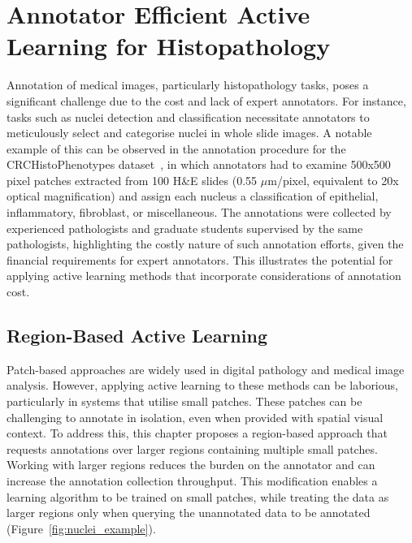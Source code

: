 \section{Annotator Efficient Active Learning for Histopathology}
\label{sec:active_annotator_efficient}
Annotation of medical images, particularly histopathology tasks, poses a significant challenge due to the cost and lack of expert annotators. For instance, tasks such as nuclei detection and classification necessitate annotators to meticulously select and categorise nuclei in whole slide images. A notable example of this can be observed in the annotation procedure for the CRCHistoPhenotypes dataset~\citep{sirinukunwattana2016locality}, in which annotators had to examine 500x500 pixel patches extracted from 100 H\&E slides (0.55 $\mu$m/pixel, equivalent to 20x optical magnification) and assign each nucleus a classification of epithelial, inflammatory, fibroblast, or miscellaneous. The annotations were collected by experienced pathologists and graduate students supervised by the same pathologists, highlighting the costly nature of such annotation efforts, given the financial requirements for expert annotators. This illustrates the potential for applying active learning methods that incorporate considerations of annotation cost.

\subsection{Region-Based Active Learning}
\label{subsec:active_region_based}
Patch-based approaches are widely used in digital pathology and medical image analysis. However, applying active learning to these methods can be laborious, particularly in systems that utilise small patches. These patches can be challenging to annotate in isolation, even when provided with spatial visual context. To address this, this chapter proposes a region-based approach that requests annotations over larger regions containing multiple small patches. Working with larger regions reduces the burden on the annotator and can increase the annotation collection throughput. This modification enables a learning algorithm to be trained on small patches, while treating the data as larger regions only when querying the unannotated data to be annotated (Figure~\ref{fig:nuclei_example}).

